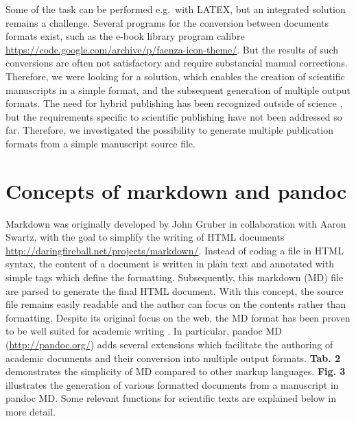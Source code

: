 \documentclass[10pt,fleqn]{wlpeerj}
\begin{document}
Some
of
the
task
can
be
performed
e.g.~with
LATEX,
but
an
integrated
solution
remains
a
challenge.
Several
programs
for
the
conversion
between
documents
formats
exist,
such
as
the
e-book
library
program
calibre
\url{https://code.google.com/archive/p/faenza-icon-theme/}.
But
the
results
of
such
conversions
are
often
not
satisfactory
and
require
substancial
manual
corrections.
Therefore,
we
were
looking
for a
solution,
which
enables
the
creation
of
scientific
manuscripts
in a
simple
format,
and
the
subsequent
generation
of
multiple
output
formats.
The
need
for
hybrid
publishing
has
been
recognized
outside
of
science
\citep{dptcollective_toolkit_2015, kielhorn_multi_2011},
but
the
requirements
specific
to
scientific
publishing
have
not
been
addressed
so
far.
Therefore,
we
investigated
the
possibility
to
generate
multiple
publication
formats
from
a
simple
manuscript
source
file.

\section{Concepts
of
markdown
and
pandoc}\label{concepts-of-markdown-and-pandoc}

Markdown
was
originally
developed
by
John
Gruber
in
collaboration
with
Aaron
Swartz,
with
the
goal
to
simplify
the
writing
of
HTML
documents
\url{http://daringfireball.net/projects/markdown/}.
Instead
of
coding
a
file
in
HTML
syntax,
the
content
of a
document
is
written
in
plain
text
and
annotated
with
simple
tags
which
define
the
formatting.
Subsequently,
this
markdown
(MD)
file
are
parsed
to
generate
the
final
HTML
document.
With
this
concept,
the
source
file
remains
easily
readable
and
the
author
can
focus
on
the
contents
rather
than
formatting.
Despite
its
original
focus
on
the
web,
the
MD
format
has
been
proven
to be
well
suited
for
academic
writing
\citep{ovadia_markdown_2014}.
In
particular,
pandoc
MD
(\url{http://pandoc.org/})
adds
several
extensions
which
facilitate
the
authoring
of
academic
documents
and
their
conversion
into
multiple
output
formats.
\textbf{Tab.
2}
demonstrates
the
simplicity
of MD
compared
to
other
markup
languages.
\textbf{Fig.
3}
illustrates
the
generation
of
various
formatted
documents
from
a
manuscript
in
pandoc
MD.
Some
relevant
functions
for
scientific
texts
are
explained
below
in
more
detail.
\end{document}
